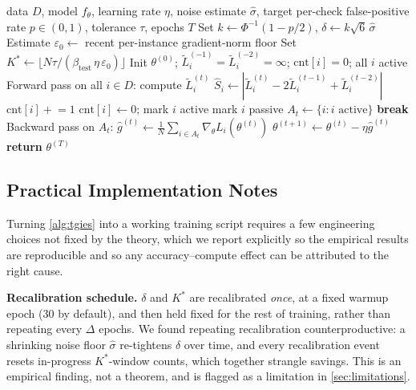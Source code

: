 \documentclass{article}
\theoremstyle{plain}
\theoremstyle{definition}
\theoremstyle{remark}
\begin{document}
\begin{algorithm}[tb]
\caption{Theory-Guided Instance-Dependent Early Stopping (TG-IES)}
\label{alg:tgies}
\begin{algorithmic}
 data $D$, model $f_\theta$, learning rate $\eta$, noise estimate $\hat\sigma$, target per-check false-positive rate $p\in(0,1)$, tolerance $\tau$, epochs $T$
\STATE Set $k \leftarrow \Phi^{-1}(1-p/2)$, $\delta \leftarrow k\sqrt6\,\hat\sigma$ 
\STATE Estimate $\varepsilon_0 \leftarrow$ recent per-instance gradient-norm floor
\STATE Set $K^* \leftarrow \lfloor N\tau / (\beta_{\mathrm{test}}\,\eta\,\varepsilon_0) \rfloor$ 
\STATE Init $\theta^{(0)}$; $\tilde L_i^{(-1)}=\tilde L_i^{(-2)}=\infty$; $\mathrm{cnt}[i]=0$; all $i$ active
   \STATE Forward pass on all $i\in D$: compute $\tilde L_i^{(t)}$
      \STATE $\hat S_i \leftarrow |\tilde L_i^{(t)} - 2\tilde L_i^{(t-1)} + \tilde L_i^{(t-2)}|$
         \STATE $\mathrm{cnt}[i] \mathrel{+}= 1$
      \ELSE
         \STATE $\mathrm{cnt}[i] \leftarrow 0$; mark $i$ active
      \ENDIF
         \STATE mark $i$ passive
      \ENDIF
   \ENDFOR
   \STATE $A_t \leftarrow \{i : i \text{ active}\}$
      \STATE \textbf{break}
   \ENDIF
   \STATE Backward pass on $A_t$: $\hat g^{(t)} \leftarrow \frac1N\sum_{i\in A_t}\nabla_\theta L_i(\theta^{(t)})$ 
   \STATE $\theta^{(t+1)} \leftarrow \theta^{(t)} - \eta\hat g^{(t)}$
\ENDFOR
\STATE \textbf{return} $\theta^{(T)}$
\end{algorithmic}
\end{algorithm}

\subsection{Practical Implementation Notes}
\label{sec:practical}

Turning \cref{alg:tgies} into a working training script requires a few engineering choices not fixed by the theory, which we report explicitly so the empirical results are reproducible and so any accuracy--compute effect can be attributed to the right cause.

\textbf{Recalibration schedule.} $\delta$ and $K^*$ are recalibrated \emph{once}, at a fixed warmup epoch (30 by default), and then held fixed for the rest of training, rather than repeating every $\Delta$ epochs. We found repeating recalibration counterproductive: a shrinking noise floor $\hat\sigma$ re-tightens $\delta$ over time, and every recalibration event resets in-progress $K^*$-window counts, which together strangle savings. This is an empirical finding, not a theorem, and is flagged as a limitation in \cref{sec:limitations}.
\end{document}
